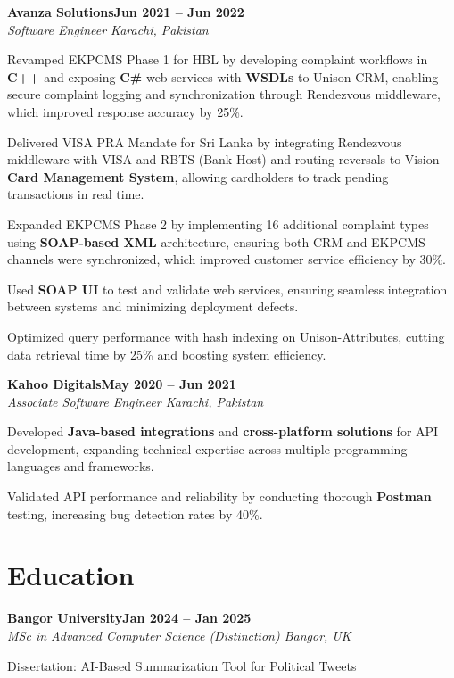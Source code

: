 \documentclass[letterpaper,10pt]{article}
\newcommand{\headingBf}[2]{
  \hspace{10pt}\textbf{#1}\hfill\textbf{#2}\\
}
\newcommand{\headingIt}[2]{
  \hspace{10pt}\textit{#1}\hfill\textit{#2}\\
}
\newenvironment{resume_list}{
  \vspace{-7pt}
  \begin{itemize}[itemsep=-2px, parsep=1pt, leftmargin=30pt]
}{
  \end{itemize}
}
\begin{document}
\headingBf{Avanza Solutions}{Jun 2021 -- Jun 2022}
\headingIt{Software Engineer \hfill Karachi, Pakistan}{}
\begin{resume_list}
    \item Revamped EKPCMS Phase 1 for HBL by developing complaint workflows in \textbf{C++} and exposing \textbf{C\#} web services with \textbf{WSDLs} to Unison CRM, enabling secure complaint logging and synchronization through Rendezvous middleware, which improved response accuracy by 25\%.
    \item Delivered VISA PRA Mandate for Sri Lanka by integrating Rendezvous middleware with VISA and RBTS (Bank Host) and routing reversals to Vision \textbf{Card Management System}, allowing cardholders to track pending transactions in real time.
    \item Expanded EKPCMS Phase 2 by implementing 16 additional complaint types using \textbf{SOAP-based XML} architecture, ensuring both CRM and EKPCMS channels were synchronized, which improved customer service efficiency by 30\%.
    \item Used \textbf{SOAP UI} to test and validate web services, ensuring seamless integration between systems and minimizing deployment defects.
    \item Optimized query performance with hash indexing on Unison-Attributes, cutting data retrieval time by 25\% and boosting system efficiency.
\end{resume_list}

\headingBf{Kahoo Digitals}{May 2020 -- Jun 2021}
\headingIt{Associate Software Engineer \hfill Karachi, Pakistan}{}
\begin{resume_list}
    \item Developed \textbf{Java-based integrations} and \textbf{cross-platform solutions} for API development, expanding technical expertise across multiple programming languages and frameworks.
    \item Validated API performance and reliability by conducting thorough \textbf{Postman} testing, increasing bug detection rates by 40\%.
\end{resume_list}

\section{Education}

\headingBf{Bangor University}{Jan 2024 -- Jan 2025}
\headingIt{MSc in Advanced Computer Science (Distinction) \hfill Bangor, UK}{}
\begin{resume_list}
    \item Dissertation: AI-Based Summarization Tool for Political Tweets
\end{resume_list}
\end{document}
